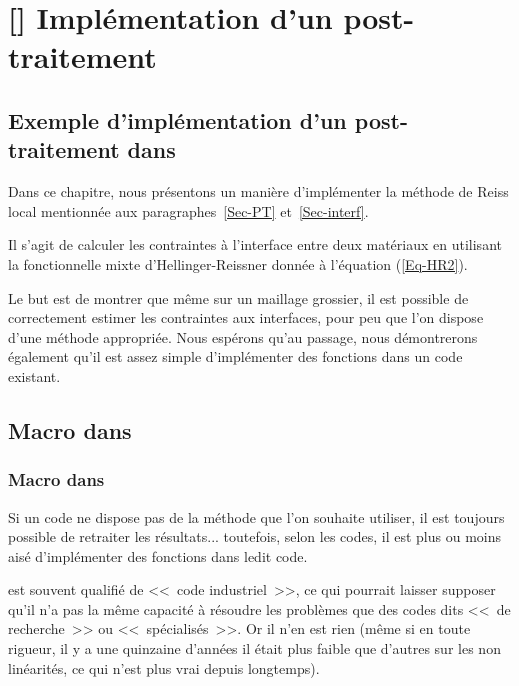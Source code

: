 \ifVersionAvecExemplesSepares
  \chapter{[\ansys] Implémentation d'un post-traitement}
\else
  \section{Exemple d'implémentation d'un post-traitement dans \ansys}
\fi

Dans ce chapitre, nous présentons un manière d'implémenter la méthode de Reiss local mentionnée aux
paragraphes~\ref{Sec-PT} et~\ref{Sec-interf}.

Il s'agit de calculer les contraintes à l'interface entre deux matériaux en utilisant la fonctionnelle mixte d'Hellinger-Reissner
donnée à l'équation (\ref{Eq-HR2}).

\medskip
Le but est de montrer que même sur un maillage grossier, il est possible de correctement estimer les contraintes
aux interfaces, pour peu que l'on dispose d'une méthode appropriée. Nous espérons qu'au passage, nous
démontrerons également qu'il est assez simple d'implémenter des fonctions dans un code existant.





\medskip
\ifVersionAvecExemplesSepares
  \section{Macro dans \ansys}
\else
  \subsection{Macro dans \ansys}
\fi

Si un code ne dispose pas de la méthode que l'on souhaite utiliser, il est toujours possible de retraiter les
résultats... toutefois, selon les codes, il est plus ou moins aisé d'implémenter des fonctions dans ledit code.

\medskip
\ansys est souvent qualifié de <<~code industriel~>>, ce qui pourrait laisser supposer qu'il n'a pas la même capacité
à résoudre les problèmes que des codes dits <<~de recherche~>> ou <<~spécialisés~>>.
Or il n'en est rien (même si en toute rigueur, il y a une quinzaine d'années il était plus faible que d'autres sur
les non linéarités, ce qui n'est plus vrai depuis longtemps).

